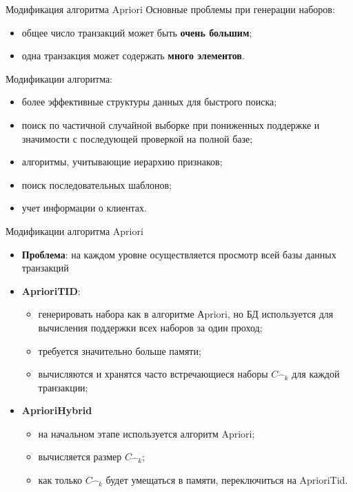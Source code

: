 \documentclass{beamer}
\begin{document}
\begin{frame}{Модификация алгоритма Apriori}
	Основные проблемы при генерации наборов:
	\begin{itemize}
		\item общее число транзакций может быть \textbf{очень большим};
		\item одна транзакция может содержать \textbf{много элементов}.
	\end{itemize}
	
	Модификации алгоритма:
	\begin{itemize}
		\item более эффективные структуры данных для быстрого поиска;
		\item поиск по частичной случайной выборке при пониженных поддержке и значимости с последующей проверкой на полной базе;
		\item алгоритмы, учитывающие иерархию признаков;
		\item поиск последовательных шаблонов;
	\item учет информации о клиентах.
	\end{itemize}
\end{frame}

\begin{frame}{Модификации алгоритма Apriori}
	\begin{itemize}
		\item \textbf{Проблема}: на каждом уровне осуществляется просмотр всей базы данных транзакций
		\item \textbf{AprioriTID}: 
  		\begin{itemize}
  			\item генерировать набора как в алгоритме Аpriori, но БД используется для вычисления поддержки всех наборов за один проход;
  			\item требуется значительно больше памяти;
  			\item вычисляются и хранятся часто встречающиеся наборы $C\hat{\text{ }}_k$ для каждой транзакции;
		\end{itemize}
		\item \textbf{AprioriHybrid} 
  		\begin{itemize}
  			\item на начальном этапе используется алгоритм Apriori;
			\item вычисляется размер $C\hat{\text{ }}_k$; 
  			\item как только $C\hat{\text{ }}_k$ будет умещаться в памяти, переключиться на AprioriTid.
  		\end{itemize}
	\end{itemize}
\end{frame}
\end{document}
